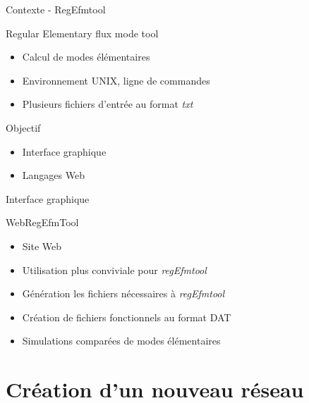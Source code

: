 \documentclass{beamer}
\begin{document}
\begin{frame}{\textcolor{bleu2}{\hspace{1cm}Contexte - RegEfmtool}}
	\begin{center}
		\begin{minipage}[c]{0.9\textwidth}
			\begin{block}{\hspace{0.2cm}Regular Elementary flux mode tool}
				\begin{itemize}
					\item Calcul de modes élémentaires
					\item Environnement UNIX, ligne de commandes
					\item Plusieurs fichiers d'entrée au format \textit{txt}
				\end{itemize}
			\end{block}
			\begin{block}{\hspace{0.2cm}Objectif}
				\begin{itemize}
					\item Interface graphique
					\item Langages Web
				\end{itemize}
			\end{block}
		\end{minipage}
	\end{center}
\end{frame}

\begin{frame}{\textcolor{bleu2}{\hspace{1cm}Interface graphique}}
	\begin{block}{\hspace{0.2cm}WebRegEfmTool}
		\begin{itemize}
			\item Site Web
			\item Utilisation plus conviviale pour \emph{regEfmtool}
			\item Génération les fichiers nécessaires à \emph{regEfmtool}
			\item Création de fichiers fonctionnels au format DAT
			\item Simulations comparées de modes élémentaires
		\end{itemize}
	\end{block}
\end{frame}

\section{Création d'un nouveau réseau}
\end{document}
